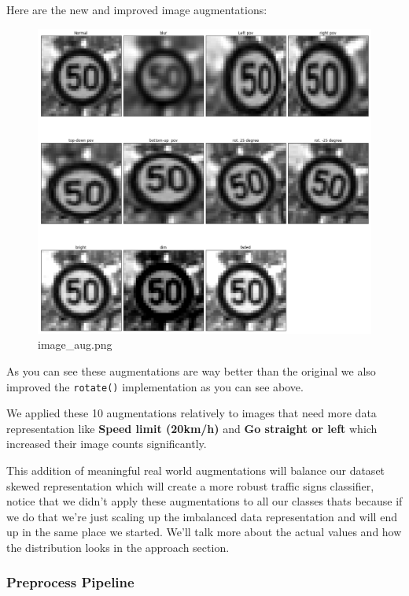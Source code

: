 \documentclass[11pt]{article}
\makeatletter
\def\maxwidth{\ifdim\Gin@nat@width>\linewidth\linewidth
    \else\Gin@nat@width\fi}
\let\Oldincludegraphics\includegraphics
\renewcommand{\includegraphics}[1]{\Oldincludegraphics[width=.8\maxwidth]{#1}}
\makeatother
\begin{document}
Here are the new and improved image augmentations:

\begin{figure}
\centering
\includegraphics{./assets/image_aug.png}
\caption{image\_aug.png}
\end{figure}

As you can see these augmentations are way better than the original we
also improved the \texttt{rotate()} implementation as you can see above.

We applied these 10 augmentations relatively to images that need more
data representation like \textbf{Speed limit (20km/h)} and \textbf{Go
straight or left} which increased their image counts significantly.

This addition of meaningful real world augmentations will balance our
dataset skewed representation which will create a more robust traffic
signs classifier, notice that we didn't apply these augmentations to all
our classes thats because if we do that we're just scaling up the
imbalanced data representation and will end up in the same place we
started. We'll talk more about the actual values and how the
distribution looks in the approach section.

    \hypertarget{preprocess-pipeline}{%
\subsubsection{Preprocess Pipeline}\label{preprocess-pipeline}}
\end{document}
